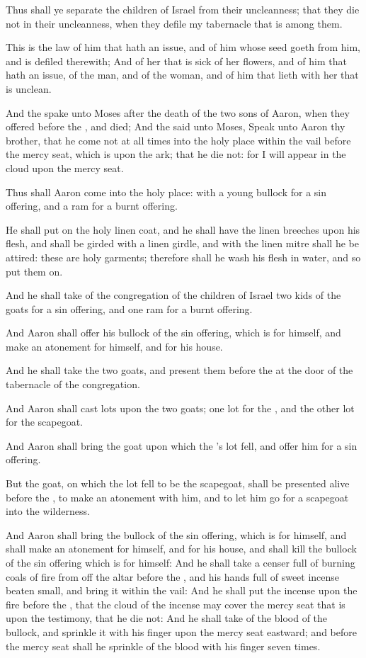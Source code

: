 \Verse Thus shall ye separate the children of Israel from their uncleanness; that they die not in their uncleanness, when they defile my tabernacle that is among them.

\Verse This is the law of him that hath an issue, and of him whose seed goeth from him, and is defiled therewith; \Verse And of her that is sick of her flowers, and of him that hath an issue, of the man, and of the woman, and of him that lieth with her that is unclean.

\Chapter
\Verse And the \LORD spake unto Moses after the death of the two sons of Aaron, when they offered before the \LORD, and died; \Verse And the \LORD said unto Moses, Speak unto Aaron thy brother, that he come not at all times into the holy place within the vail before the mercy seat, which is upon the ark; that he die not: for I will appear in the cloud upon the mercy seat.

\Verse Thus shall Aaron come into the holy place: with a young bullock for a sin offering, and a ram for a burnt offering.

\Verse He shall put on the holy linen coat, and he shall have the linen breeches upon his flesh, and shall be girded with a linen girdle, and with the linen mitre shall he be attired: these are holy garments; therefore shall he wash his flesh in water, and so put them on.

\Verse And he shall take of the congregation of the children of Israel two kids of the goats for a sin offering, and one ram for a burnt offering.

\Verse And Aaron shall offer his bullock of the sin offering, which is for himself, and make an atonement for himself, and for his house.

\Verse And he shall take the two goats, and present them before the \LORD at the door of the tabernacle of the congregation.

\Verse And Aaron shall cast lots upon the two goats; one lot for the \LORD, and the other lot for the scapegoat.

\Verse And Aaron shall bring the goat upon which the \LORD's lot fell, and offer him for a sin offering.

\Verse But the goat, on which the lot fell to be the scapegoat, shall be presented alive before the \LORD, to make an atonement with him, and to let him go for a scapegoat into the wilderness.

\Verse And Aaron shall bring the bullock of the sin offering, which is for himself, and shall make an atonement for himself, and for his house, and shall kill the bullock of the sin offering which is for himself: \Verse And he shall take a censer full of burning coals of fire from off the altar before the \LORD, and his hands full of sweet incense beaten small, and bring it within the vail: \Verse And he shall put the incense upon the fire before the \LORD, that the cloud of the incense may cover the mercy seat that is upon the testimony, that he die not: \Verse And he shall take of the blood of the bullock, and sprinkle it with his finger upon the mercy seat eastward; and before the mercy seat shall he sprinkle of the blood with his finger seven times.

